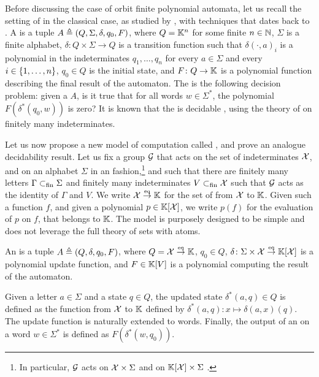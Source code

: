 \AP Before discussing the case of orbit finite polynomial automata, let us
recall the setting of  in the classical case, as
studied by \cite{BEDUSHWO17}, with techniques that dates back to
\cite{MULSEI02}. A  is a tuple $A \triangleq (Q,
\Sigma, \delta, q_0, F)$, where $Q = \mathbb{K}^n$ for some finite $n \in \mathbb{N}$, $\Sigma$
is a finite alphabet, $\delta \colon Q \times \Sigma \to Q$ is a transition
function such that $\delta(\cdot,a)_i$ is a polynomial in the indeterminates
$q_1, \dots, q_n$ for every $a \in \Sigma$ and every $i \in \{ 1, \dots, n \}$,
$q_0 \in Q$ is the initial state, and $F \colon Q \to \mathbb{K}$ is a polynomial
function describing the final result of the automaton. The  is the following decision problem: given a
 $A$, is it true that for all words $w \in \Sigma^*$,
the polynomial $F(\delta^*(q_0, w))$ is zero? It is known that the  is decidable \cite{BEDUSHWO17}, using the
theory of  on finitely many indeterminates. 


\newcommand{\toequiv}{\stackrel{\text{\tiny{eq}}}{\to}}

\AP Let us now propose a new model of computation called , and prove an analogue decidability result. Let us fix a
group $\mathcal{G}$ that acts on the set of indeterminates $\mathcal{X}$, and on an
alphabet $\Sigma$ in an  fashion,\footnote{ In
particular, $\mathcal{G}$ acts on $\mathcal{X} \times \Sigma$ and on $\mathbb{K}[\mathcal{X}]
\times \Sigma$ . } and such that there are
finitely many letters $\Gamma \subset_{\text{fin}} \Sigma$ and finitely many indeterminates
$V \subset_{\text{fin}} \mathcal{X}$ such that $\mathcal{G}$ acts as the identity of $\Gamma$ and
$V$. We write $\Indets \toequiv \K$ for the set of 
from $\mathcal{X}$ to $\mathbb{K}$. Given such a function $f$, and given a polynomial $p
\in \mathbb{K}[\mathcal{X}]$, we write $p(f)$ for the evaluation of $p$ on $f$, that
belongs to $\mathbb{K}$. The model is purposely designed to be simple and does not
leverage the full theory of sets with atoms.

\begin{definition}
  \label{def:orbit-finite-polynomial-automaton}
  An  is a tuple $A \triangleq (Q, \delta, q_0, F)$, where $Q =
  \Indets \toequiv \K$, $q_0 \in Q$, $\delta \colon
  \Sigma \times \Indets \toequiv \poly{\K}{\Indets}$ 
  is a
  polynomial update function, and $F \in \mathbb{K}[V]$ is a polynomial 
  computing the result of the automaton. 

  Given a letter $a \in \Sigma$ and a
  state $q \in Q$, the updated state $\delta^*(a,q)  \in Q$ is defined as the function from
  $\mathcal{X}$ to $\mathbb{K}$ defined by $\delta^*(a,q) \colon x \mapsto \delta(a,x)( q )$.
  The update function is naturally extended to words. Finally, the
  output of an  on a word $w \in \Sigma^*$
  is defined as $F(\delta^*(w,q_0))$.
\end{definition}

